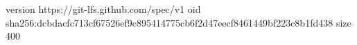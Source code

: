 version https://git-lfs.github.com/spec/v1
oid sha256:dcbdacfc713cf67526ef9c895414775cb6f2d47eecf8461449bf223c8b1fd438
size 400
